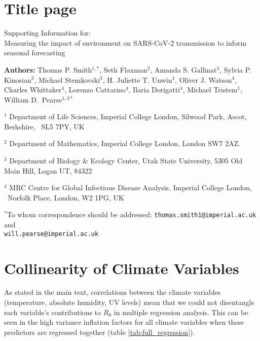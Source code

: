 \documentclass[12pt,english,a4paper]{article}
\newcommand{\RO}{$R_0$\xspace}
\begin{document}
\setlength{\parindent}{0pt}

\section*{Title page}

Supporting Information for: \\ Measuring the impact of environment on SARS-CoV-2 transmission to inform seasonal forecasting


\textbf{Authors:} Thomas P. Smith$^{1,*}$,
Seth Flaxman$^2$, Amanda S. Gallinat$^3$, Sylvia P. Kinosian$^3$, Michael Stemkovski$^3$,
H. Juliette T. Unwin$^4$,
Oliver J. Watson$^4$, Charles Whittaker$^4$,
Lorenzo Cattarino$^4$, Ilaria Dorigatti$^4$, Michael Tristem$^1$,
William D.\ Pearse$^{1,3*}$

$^1$ Department of Life Sciences, Imperial College London, Silwood Park, Ascot, Berkshire, \
 SL5 7PY, UK
 
$^2$ Department of Mathematics, Imperial College London, London SW7 2AZ.

$^3$ Department of Biology \& Ecology Center, Utah State University,
5305 Old Main Hill, Logan UT, 84322

$^4$ MRC Centre for Global Infectious Disease Analysis, Imperial College London, \ 
Norfolk Place, London, W2 1PG, UK 

$^*$To whom correspondence should be addressed:
\texttt{thomas.smith1@imperial.ac.uk} and \\
\texttt{will.pearse@imperial.ac.uk}

\clearpage

\tableofcontents

\clearpage


\section{Collinearity of Climate Variables}

As stated in the main text, correlations between the climate variables (temperature, absolute humidity, UV levels) mean that we could not disentangle each variable's contributions to \RO in multiple regression analysis. This can be seen in the high variance inflation factors for all climate variables when these predictors are regressed together (table \ref{tab:full_regression}).
\end{document}
